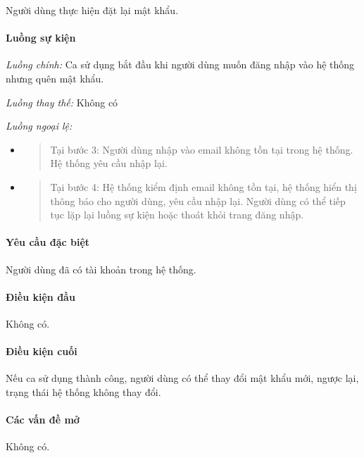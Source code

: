 \documentclass[./../main.tex]{subfiles}
\begin{document}
Người dùng thực hiện đặt lại mật khẩu.

\paragraph*{Luồng sự kiện}

\emph{Luồng chính:} Ca sử dụng bắt đầu khi người dùng muốn đăng nhập vào
hệ thống nhưng quên mật khẩu.

\emph{Luồng thay thế:} Không có

\emph{Luồng ngoại lệ:}

\begin{itemize}
\item
  \begin{quote}
  Tại bước 3: Người dùng nhập vào email không tồn tại trong hệ thống. Hệ
  thống yêu cầu nhập lại.
  \end{quote}
\item
  \begin{quote}
  Tại bước 4: Hệ thống kiểm định email không tồn tại, hệ thống hiển thị
  thông báo cho người dùng, yêu cầu nhập lại. Người dùng có thể tiếp tục
  lặp lại luồng sự kiện hoặc thoát khỏi trang đăng nhập.
  \end{quote}
\end{itemize}

\paragraph*{Yêu cầu đặc biệt}

Người dùng đã có tài khoản trong hệ thống.

\paragraph*{Điều kiện đầu}

Không có.

\paragraph*{Điều kiện cuối}

Nếu ca sử dụng thành công, người dùng có thể thay đổi mật khẩu mới,
ngược lại, trạng thái hệ thống không thay đổi.

\paragraph*{Các vấn đề mở}

Không có.
\end{document}
